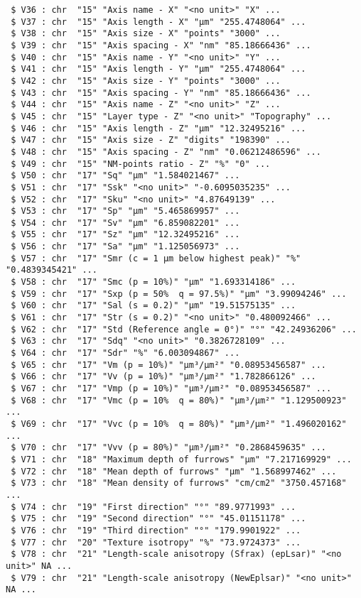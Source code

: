 \documentclass[
]{article}
\begin{document}
\begin{verbatim}
 $ V36 : chr  "15" "Axis name - X" "<no unit>" "X" ...
 $ V37 : chr  "15" "Axis length - X" "µm" "255.4748064" ...
 $ V38 : chr  "15" "Axis size - X" "points" "3000" ...
 $ V39 : chr  "15" "Axis spacing - X" "nm" "85.18666436" ...
 $ V40 : chr  "15" "Axis name - Y" "<no unit>" "Y" ...
 $ V41 : chr  "15" "Axis length - Y" "µm" "255.4748064" ...
 $ V42 : chr  "15" "Axis size - Y" "points" "3000" ...
 $ V43 : chr  "15" "Axis spacing - Y" "nm" "85.18666436" ...
 $ V44 : chr  "15" "Axis name - Z" "<no unit>" "Z" ...
 $ V45 : chr  "15" "Layer type - Z" "<no unit>" "Topography" ...
 $ V46 : chr  "15" "Axis length - Z" "µm" "12.32495216" ...
 $ V47 : chr  "15" "Axis size - Z" "digits" "198390" ...
 $ V48 : chr  "15" "Axis spacing - Z" "nm" "0.06212486596" ...
 $ V49 : chr  "15" "NM-points ratio - Z" "%" "0" ...
 $ V50 : chr  "17" "Sq" "µm" "1.584021467" ...
 $ V51 : chr  "17" "Ssk" "<no unit>" "-0.6095035235" ...
 $ V52 : chr  "17" "Sku" "<no unit>" "4.87649139" ...
 $ V53 : chr  "17" "Sp" "µm" "5.465869957" ...
 $ V54 : chr  "17" "Sv" "µm" "6.859082201" ...
 $ V55 : chr  "17" "Sz" "µm" "12.32495216" ...
 $ V56 : chr  "17" "Sa" "µm" "1.125056973" ...
 $ V57 : chr  "17" "Smr (c = 1 µm below highest peak)" "%" "0.4839345421" ...
 $ V58 : chr  "17" "Smc (p = 10%)" "µm" "1.693314186" ...
 $ V59 : chr  "17" "Sxp (p = 50%  q = 97.5%)" "µm" "3.99094246" ...
 $ V60 : chr  "17" "Sal (s = 0.2)" "µm" "19.51575135" ...
 $ V61 : chr  "17" "Str (s = 0.2)" "<no unit>" "0.480092466" ...
 $ V62 : chr  "17" "Std (Reference angle = 0°)" "°" "42.24936206" ...
 $ V63 : chr  "17" "Sdq" "<no unit>" "0.3826728109" ...
 $ V64 : chr  "17" "Sdr" "%" "6.003094867" ...
 $ V65 : chr  "17" "Vm (p = 10%)" "µm³/µm²" "0.08953456587" ...
 $ V66 : chr  "17" "Vv (p = 10%)" "µm³/µm²" "1.782866126" ...
 $ V67 : chr  "17" "Vmp (p = 10%)" "µm³/µm²" "0.08953456587" ...
 $ V68 : chr  "17" "Vmc (p = 10%  q = 80%)" "µm³/µm²" "1.129500923" ...
 $ V69 : chr  "17" "Vvc (p = 10%  q = 80%)" "µm³/µm²" "1.496020162" ...
 $ V70 : chr  "17" "Vvv (p = 80%)" "µm³/µm²" "0.2868459635" ...
 $ V71 : chr  "18" "Maximum depth of furrows" "µm" "7.217169929" ...
 $ V72 : chr  "18" "Mean depth of furrows" "µm" "1.568997462" ...
 $ V73 : chr  "18" "Mean density of furrows" "cm/cm2" "3750.457168" ...
 $ V74 : chr  "19" "First direction" "°" "89.9771993" ...
 $ V75 : chr  "19" "Second direction" "°" "45.01151178" ...
 $ V76 : chr  "19" "Third direction" "°" "179.9901922" ...
 $ V77 : chr  "20" "Texture isotropy" "%" "73.9724373" ...
 $ V78 : chr  "21" "Length-scale anisotropy (Sfrax) (epLsar)" "<no unit>" NA ...
 $ V79 : chr  "21" "Length-scale anisotropy (NewEplsar)" "<no unit>" NA ...

\end{verbatim}
\end{document}
